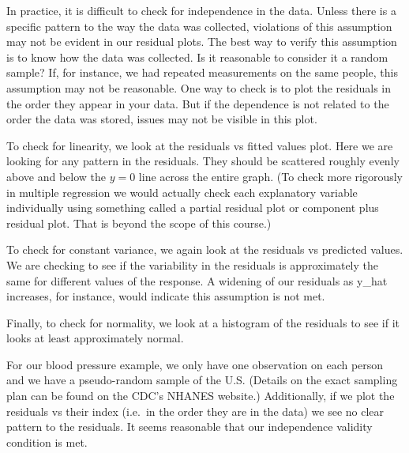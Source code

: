 \documentclass[
]{book}
\newenvironment{Shaded}{\begin{snugshade}}{\end{snugshade}}
\newcommand{\DecValTok}[1]{\textcolor[rgb]{0.00,0.00,0.81}{#1}}
\newcommand{\FunctionTok}[1]{\textcolor[rgb]{0.00,0.00,0.00}{#1}}
\newcommand{\NormalTok}[1]{#1}
\newcommand{\SpecialCharTok}[1]{\textcolor[rgb]{0.00,0.00,0.00}{#1}}
\begin{document}
In practice, it is difficult to check for independence in the data. Unless there is a specific pattern to the way the data was collected, violations of this assumption may not be evident in our residual plots. The best way to verify this assumption is to know how the data was collected. Is it reasonable to consider it a random sample? If, for instance, we had repeated measurements on the same people, this assumption may not be reasonable. One way to check is to plot the residuals in the order they appear in your data. But if the dependence is not related to the order the data was stored, issues may not be visible in this plot.

To check for linearity, we look at the residuals vs fitted values plot. Here we are looking for any pattern in the residuals. They should be scattered roughly evenly above and below the \(y=0\) line across the entire graph. (To check more rigorously in multiple regression we would actually check each explanatory variable individually using something called a partial residual plot or component plus residual plot. That is beyond the scope of this course.)

To check for constant variance, we again look at the residuals vs predicted values. We are checking to see if the variability in the residuals is approximately the same for different values of the response. A widening of our residuals as y\_hat increases, for instance, would indicate this assumption is not met.

Finally, to check for normality, we look at a histogram of the residuals to see if it looks at least approximately normal.

For our blood pressure example, we only have one observation on each person and we have a pseudo-random sample of the U.S. (Details on the exact sampling plan can be found on the CDC's NHANES website.) Additionally, if we plot the residuals vs their index (i.e.~in the order they are in the data) we see no clear pattern to the residuals. It seems reasonable that our independence validity condition is met.

\begin{Shaded}
\end{Shaded}
\end{document}
